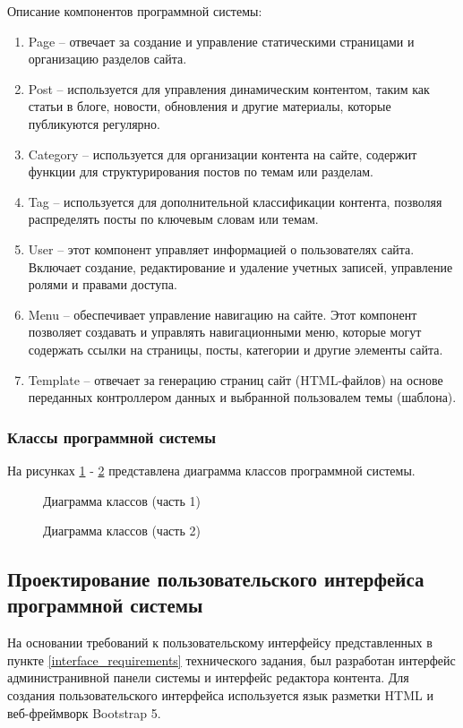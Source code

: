 Описание компонентов программной системы:
\begin{enumerate}
	\item Page -- отвечает за создание и управление статическими страницами и организацию разделов сайта.
	\item Post -- используется для управления динамическим контентом, таким как статьи в блоге, новости, обновления и другие материалы, которые публикуются регулярно.
	\item Category -- используется для организации контента на сайте, содержит функции для структурирования постов по темам или разделам.
	\item Tag -- используется для дополнительной классификации контента, позволяя распределять посты по ключевым словам или темам.
	\item User -- этот компонент управляет информацией о пользователях сайта. Включает создание, редактирование и удаление учетных записей, управление ролями и правами доступа.
	\item Menu -- обеспечивает управление навигацию на сайте. Этот компонент позволяет создавать и управлять навигационными меню, которые могут содержать ссылки на страницы, посты, категории и другие элементы сайта.
	\item Template -- отвечает за генерацию страниц сайт (HTML-файлов) на основе переданных контроллером данных и выбранной пользовалем темы (шаблона).
\end{enumerate}

\subsubsection{Классы программной системы}
На рисунках \ref{class1:image} - \ref{class2:image} представлена диаграмма классов программной системы.

\begin{figure}[H]
	\caption{Диаграмма классов (часть 1)}
	\label{class1:image}
\end{figure}

\begin{figure}[H]
	\caption{Диаграмма классов (часть 2)}
	\label{class2:image}
\end{figure}

\subsection{Проектирование пользовательского интерфейса программной системы}
На основании требований к пользовательскому интерфейсу представленных в пункте \ref{interface_requirements} технического задания, был разработан интерфейс администранивной панели системы и интерфейс редактора контента. Для создания пользовательского интерфейса используется язык разметки HTML и веб-фреймворк Bootstrap 5.

